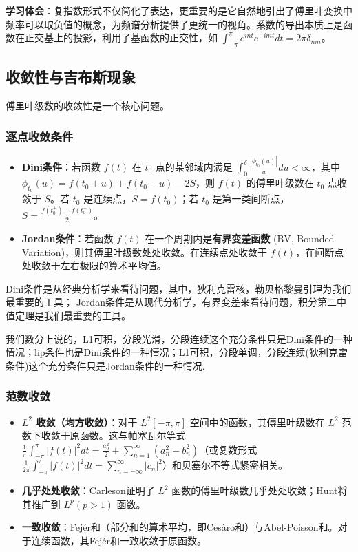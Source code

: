 \documentclass[UTF8]{ctexart}
\begin{document}
	\textbf{学习体会}：复指数形式不仅简化了表达，更重要的是它自然地引出了傅里叶变换中频率可以取负值的概念，为频谱分析提供了更统一的视角。系数的导出本质上是函数在正交基上的投影，利用了基函数的正交性，如 $\int_{-\pi}^{\pi} e^{int} e^{-imt} dt = 2\pi \delta_{nm}$。
	
	\subsection{收敛性与吉布斯现象}
	傅里叶级数的收敛性是一个核心问题。
	
	\subsubsection{逐点收敛条件}
	\begin{itemize}
		\item \textbf{Dini条件}：若函数 $f(t)$ 在 $t_0$ 点的某邻域内满足 $\int_0^\delta \frac{|\phi_{t_0}(u)|}{u} du < \infty$，其中 $\phi_{t_0}(u) = f(t_0+u) + f(t_0-u) - 2S$，则 $f(t)$ 的傅里叶级数在 $t_0$ 点收敛于 $S$。若 $t_0$ 是连续点，$S=f(t_0)$；若 $t_0$ 是第一类间断点，$S = \frac{f(t_0^+) + f(t_0^-)}{2}$。
		\item \textbf{Jordan条件}：若函数 $f(t)$ 在一个周期内是\textbf{有界变差函数} (BV, Bounded Variation)，则其傅里叶级数处处收敛。在连续点处收敛于 $f(t)$，在间断点处收敛于左右极限的算术平均值。
	\end{itemize}
	
	Dini条件是从经典分析学来看待问题，其中，狄利克雷核，勒贝格黎曼引理为我们最重要的工具；	Jordan条件是从现代分析学，有界变差来看待问题，积分第二中值定理是我们最重要的工具。
	
	我们数分上说的，L1可积，分段光滑，分段连续这个充分条件只是Dini条件的一种情况；lip条件也是Dini条件的一种情况；L1可积，分段单调，分段连续(狄利克雷条件)这个充分条件只是Jordan条件的一种情况.
	
	
	\subsubsection{范数收敛}
	\begin{itemize}
		\item \textbf{$L^2$ 收敛（均方收敛）}：对于 $L^2[-\pi, \pi]$ 空间中的函数，其傅里叶级数在 $L^2$ 范数下收敛于原函数。这与帕塞瓦尔等式 $\frac{1}{\pi}\int_{-\pi}^{\pi} |f(t)|^2 dt = \frac{a_0^2}{2} + \sum_{n=1}^\infty (a_n^2 + b_n^2)$（或复数形式 $\frac{1}{2\pi}\int_{-\pi}^{\pi} |f(t)|^2 dt = \sum_{n=-\infty}^\infty |c_n|^2$）和贝塞尔不等式紧密相关。
		\item \textbf{几乎处处收敛}：Carleson证明了 $L^2$ 函数的傅里叶级数几乎处处收敛；Hunt将其推广到 $L^p (p>1)$ 函数。
		\item \textbf{一致收敛}：Fejér和（部分和的算术平均，即Cesàro和）与Abel-Poisson和。对于连续函数，其Fejér和一致收敛于原函数。
	\end{itemize}
	
\end{document}
